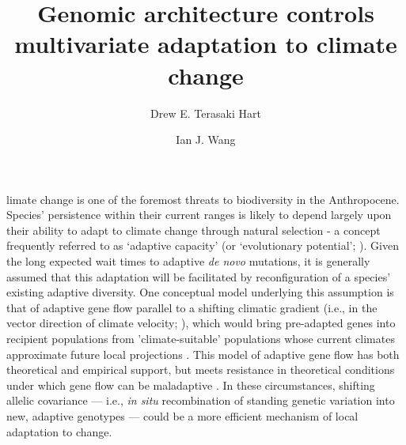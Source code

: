 \documentclass[9pt,twocolumn,twoside,lineno]{pnas-new}
\title{Genomic architecture controls multivariate adaptation to climate change}
\author[a,1]{Drew E. Terasaki Hart}
\author[a]{Ian J. Wang}
\affil[a]{Department of Environmental Science, Policy, and Management, University of California, Berkeley, CA 94720}
\begin{document}
\maketitle
\thispagestyle{firststyle}




limate change is one of the foremost threats to biodiversity in the Anthropocene.
Species’ persistence within their current ranges is likely to depend largely upon their ability to
adapt to climate change through natural selection - a concept frequently referred to 
as `adaptive capacity’ (or `evolutionary potential’;
\cite{chevin,harrisson,nicotra,vilas,wade}).
Given the long expected wait times to adaptive \textit{de novo} mutations,
it is generally assumed that this adaptation will be facilitated
by reconfiguration of a species' existing adaptive diversity.
One conceptual model underlying this assumption is that of
adaptive gene flow parallel to a shifting climatic gradient
(i.e., in the vector
direction of climate velocity; \cite{ackerly}),
which would bring pre-adapted genes into recipient populations
from 'climate-suitable' populations
whose current climates approximate future local projections \cite{bellis}.
This model of adaptive gene flow has both theoretical
\cite{aitken_whitlock,slatkin,tigano}
and empirical 
\cite{feder,bell}
support,
but meets resistance in theoretical conditions under which gene flow can be maladaptive
\cite{wang,lenormand,slatkin,haldane,wright,felsenstein}.
In these circumstances, shifting allelic covariance --- 
i.e., \textit{in situ} recombination of standing genetic variation into new,
adaptive genotypes --- could be a more efficient mechanism of local adaptation to change.
\end{document}
